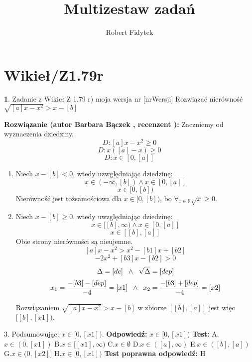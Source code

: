 \documentclass[12pt, a4paper]{article}
\title{Multizestaw zadań}
\author{Robert Fidytek}
\date{}
\theoremstyle{definition} %
\newtheorem{zad}{}
\newcommand{\kategoria}[1]{\section{#1}} %
\newcommand{\zadStart}[1]{\begin{zad}#1\newline} %
\newcommand{\zadStop}{\end{zad}}   %
\newcommand{\rozwStart}[2]{\noindent \textbf{Rozwiązanie (autor #1 , recenzent #2): }\newline} %
\newcommand{\rozwStop}{\newline}                                            %
\newcommand{\odpStart}{\noindent \textbf{Odpowiedź:}\newline}    %
\newcommand{\odpStop}{\newline}                                             %
\newcommand{\testStart}{\noindent \textbf{Test:}\newline} %
\newcommand{\testStop}{\newline} %
\newcommand{\kluczStart}{\noindent \textbf{Test poprawna odpowiedź:}\newline} %
\newcommand{\kluczStop}{\newline} %
\begin{document}
\maketitle


\kategoria{Wikieł/Z1.79r}
\zadStart{Zadanie z Wikieł Z 1.79 r) moja wersja nr [nrWersji]}
Rozwiązać nierówność $\sqrt{[a]x- x^2}>x-[b]$
\zadStop
\rozwStart{Barbara Bączek}{}
Zaczniemy od wyznaczenia dziedziny.
$$D: [a]x- x^2 \geq 0$$
$$D: x([a]-x) \geq 0$$
$$D: x \in [0, [a]]$$
\begin{enumerate}
\item Niech $x -[b] <0$, wtedy uzwględniając dziedzinę:
$$x \in (-\infty,[b]) \wedge x \in [0,[a]]$$
$$x \in [0, [b])$$
Nierówność jest tożsamościowa dla $x \in [0, [b])$, bo $\displaystyle\mathop{\forall}_{x \in \mathbb{R}} \sqrt{x} \geq 0$.
\item  Niech $x -[b] \geq 0$, wtedy uwzględniając dziedzinę:
$$x \in [[b], \infty) \wedge x \in [0,[a]]$$
$$x \in [[b], [a]]$$
Obie strony nierówności są nieujemne.
$$[a]x - x^2 > x^2 -[b1]x +[b2]$$
$$-2x^2 +[b3]x -[b2]>0$$
$$\Delta = [de] \hspace{0.2 cm} \wedge \hspace{0.2 cm} \sqrt{\Delta}= [dep]$$
$$x_1 = \frac{-[b3]-[dep]}{-4}=[x1]  \hspace{0.2 cm} \wedge \hspace{0.2 cm} x_2 = \frac{-[b3]+[dep]}{-4}=[x2]$$

Rozwiązaniem $\sqrt{[a]x- x^2}>x-[b]$ w zbiorze $[[b], [a]]$ jest więc $[[b],[x1])$.
\end{enumerate}
3. Podsumowując: $x \in [0,[x1]).$
\rozwStop
\odpStart
$x \in [0,[x1])$
\odpStop
\testStart
A.$x \in (0,[x1])$
B.$x \in [[x1],\infty)$
C.$x \in \emptyset$
D.$x \in ([a],\infty)$
E.$x \in  ([b],[a])$
G.$x \in (0,[x2]]$
H.$x \in [0,[x1])$
\testStop
\kluczStart
H
\kluczStop
\end{document}
